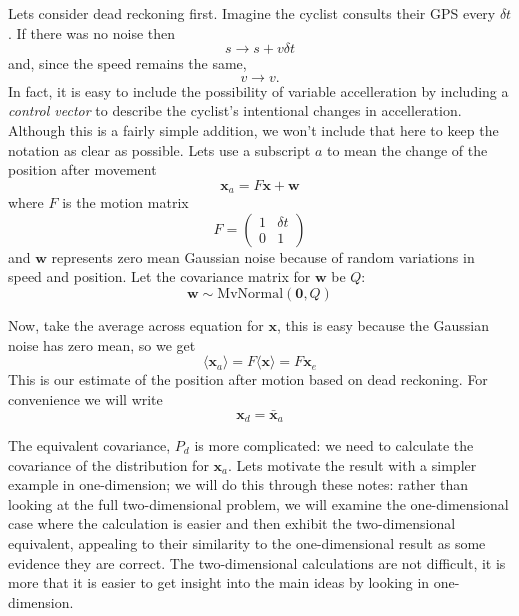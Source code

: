 \documentclass[12pt]{article}
\begin{document}
Lets consider dead reckoning first. Imagine the cyclist consults their
GPS every $\delta t$. If there was no noise then
\begin{equation}
s\rightarrow s+v\delta t
\end{equation}
and, since the speed remains the same, 
\begin{equation}
  v\rightarrow v.
\end{equation}
In fact, it is easy to include the possibility of variable
accelleration by including a \textsl{control vector} to describe the
cyclist's intentional changes in accelleration. Although this is a
fairly simple addition, we won't include that here to keep the
notation as clear as possible. Lets use a subscript $a$ to mean the
change of the position after movement
\begin{equation}
\textbf{x}_a=F\textbf{x}+\textbf{w}
\end{equation}
where $F$ is the motion matrix
\begin{equation}
F=\left(\begin{array}{cc}1&\delta t\\0&1\end{array}\right)
\end{equation}
and $\mathbf{w}$ represents zero mean Gaussian noise because of random
variations in speed and position. Let the covariance matrix for
$\mathbf{w}$ be $Q$:
\begin{equation}
  \mathbf{w}\sim\text{MvNormal}(\textbf{0},Q)
\end{equation}


Now, take the average across equation for $\mathbf{x}$, this is easy
because the Gaussian noise has zero mean, so we get
\begin{equation}
\langle\mathbf{x}_a\rangle=F\langle\mathbf{x}\rangle=F\mathbf{x}_e
\end{equation}
This is our estimate of the position after motion based on dead
reckoning. For convenience we will write
\begin{equation}
  \mathbf{x}_d=\mathbf{\bar{x}}_a
\end{equation}

The equivalent covariance, $P_d$ is more complicated: we need to
calculate the covariance of the distribution for $\textbf{x}_a$. Lets
motivate the result with a simpler example in one-dimension; we will
do this through these notes: rather than looking at the full
two-dimensional problem, we will examine the one-dimensional case
where the calculation is easier and then exhibit the two-dimensional
equivalent, appealing to their similarity to the one-dimensional
result as some evidence they are correct. The two-dimensional
calculations are not difficult, it is more that it is easier to get
insight into the main ideas by looking in one-dimension.
\end{document}
